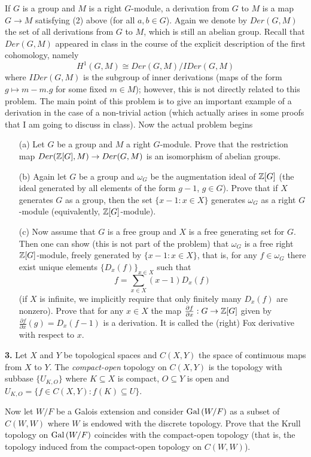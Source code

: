 \documentclass[12pt]{amsart}
\begin{document}
If $G$ is a group and $M$ is a right $G$-module, a derivation from $G$ to $M$ is a map $G\to M$ satisfying (2) above (for all $a,b\in G$).
Again we denote by $Der(G,M)$ the set of all derivations from $G$ to $M$, which is still an abelian group. 
Recall that $Der(G,M)$ appeared in class in the course of the explicit description of the first cohomology,
namely $$H^1(G,M)\cong Der(G,M)/IDer(G,M)$$ where $IDer(G,M)$ is the subgroup of inner derivations (maps of the form $g\mapsto m-m.g$
for some fixed $m\in M$); however, this is not directly related to this problem. The main point of this problem is to give an important example of a derivation in the case of a non-trivial action (which actually arises in some proofs that I am going to discuss in class).
\skv
Now the actual problem begins
\begin{itemize}
\item[(a)] Let $G$ be a group and $M$ a right $G$-module. Prove that the restriction map $Der({\mathbb Z}[G],M)\to Der(G,M)$ is an isomorphism of
abelian groups. 
\item[(b)] Again let $G$ be a group and $\omega_G$ be the augmentation ideal of ${\mathbb Z}[G]$ 
(the ideal generated by all elements of the form $g-1$, $g\in G$). Prove that if $X$ generates $G$ as a group, then the
set $\{x-1: x\in X\}$ generates $\omega_G$ as a right $G$-module (equivalently, ${\mathbb Z}[G]$-module).
\item[(c)] Now assume that $G$ is a free group and $X$ is a free generating set for $G$. Then one can show (this is not part of the problem) that
$\omega_G$ is a free right ${\mathbb Z}[G]$-module, freely generated by $\{x-1: x\in X\}$, that is, for any $f\in \omega_G$ there
exist unique elements $\{D_x(f)\}_{x\in X}$ such that $$f=\sum\limits_{x\in X} (x-1)D_x(f)$$ (if $X$ is infinite, we implicitly require that only finitely many $D_x(f)$ are nonzero). Prove that for any $x\in X$ the map $\frac{\partial f}{\partial x}: G\to {\mathbb Z}[G]$
given by $\frac{\partial f}{\partial x}(g)=D_x(f-1)$ is a derivation. It is called the (right) {Fox derivative} with respect to $x$.
\end{itemize}
\skv

{\bf 3.} Let $X$ and $Y$ be topological spaces and $C(X,Y)$ the space of continuous maps from $X$ to $Y$. The {\it compact-open} topology
on $C(X,Y)$ is the topology with subbase $\{U_{K,O}\}$ where $K\subseteq X$ is compact, $O\subseteq Y$ is open and 
$U_{K,O}=\{f\in C(X,Y): f(K)\subseteq U\}$.

Now let $W/F$ be a Galois extension and consider ${\rm Gal\,}(W/F)$ as a subset of $C(W,W)$ where $W$ is endowed with the discrete topology. Prove that
the Krull topology on ${\rm Gal\,}(W/F)$ coincides with the compact-open topology (that is, the topology induced from the compact-open topology on
$C(W,W)$).
\skv
\end{document}
